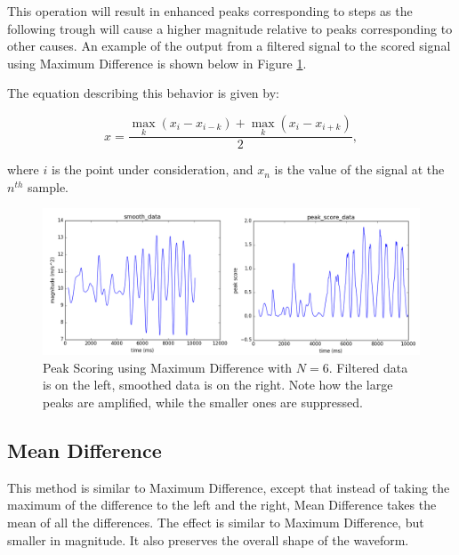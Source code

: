                 This operation will result in enhanced peaks corresponding to steps as the following trough will cause a higher magnitude relative to peaks corresponding to other causes. An example of the output from a filtered signal to the scored signal using Maximum Difference is shown below in Figure \ref{max_diff_score}.

                The equation describing this behavior is given by:

                \begin{equation}
                x = \frac{\max\limits_k{(x_i - x_{i-k})} + \max\limits_k{(x_i - x_{i+k})}}{2},
                \end{equation}

                where $i$ is the point under consideration, and $x_n$ is the value of the signal at the $n^{th}$ sample.

                \begin{figure}[!th]
                    \includegraphics[width=\textwidth]{Images/max_diff_score.png}
                    \centering
                    \caption{Peak Scoring using Maximum Difference with $N=6$. Filtered data is on the left, smoothed data is on the right. Note how the large peaks are amplified, while the smaller ones are suppressed.}
                    \label{max_diff_score}
                \end{figure}                 

            \subsection{Mean Difference}

                This method is similar to Maximum Difference, except that instead of taking the maximum of the difference to the left and the right, Mean Difference takes the mean of all the differences. The effect is similar to Maximum Difference, but smaller in magnitude. It also preserves the overall shape of the waveform.


